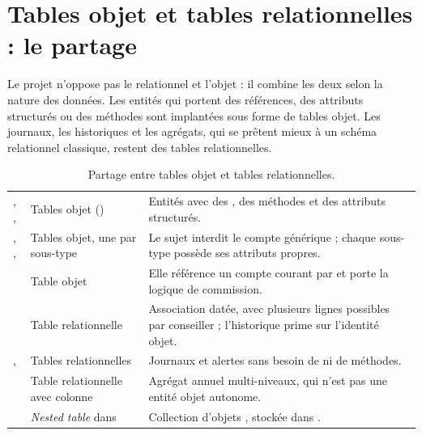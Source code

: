 \section{Tables objet et tables relationnelles : le partage}

Le projet n'oppose pas le relationnel et l'objet : il combine les deux selon
la nature des données. Les entités qui portent des références, des attributs
structurés ou des méthodes sont implantées sous forme de tables objet. Les
journaux, les historiques et les agrégats, qui se prêtent mieux à un schéma
relationnel classique, restent des tables relationnelles.

\begin{table}[htbp]
  \centering
  \small
  \caption{Partage entre tables objet et tables relationnelles.}
  \label{tab:partage-objet-relationnel}
  \begin{tabularx}{\textwidth}{@{}L{3.6cm}L{4.8cm}X@{}}
    \toprule
     &  &  \\
    \midrule
    , ,  &
    Tables objet () &
    Entités avec des , des méthodes et des attributs structurés. \\
    , ,  &
    Tables objet, une par sous-type &
    Le sujet interdit le compte générique ; chaque sous-type possède ses
    attributs propres. \\
     &
    Table objet &
    Elle référence un compte courant par  et porte la logique de
    commission. \\
     &
    Table relationnelle &
    Association datée, avec plusieurs lignes possibles par conseiller ;
    l'historique prime sur l'identité objet. \\
    ,  &
    Tables relationnelles &
    Journaux et alertes sans besoin de  ni de méthodes. \\
     &
    Table relationnelle avec colonne  &
    Agrégat annuel multi-niveaux, qui n'est pas une entité objet autonome. \\
     &
    \emph{Nested table} dans  &
    Collection d'objets , stockée dans
    . \\
    \bottomrule
  \end{tabularx}
\end{table}

